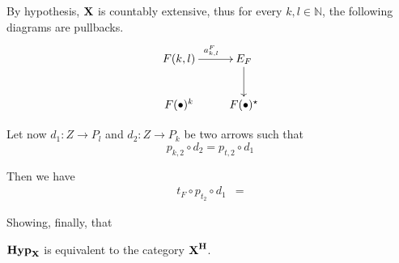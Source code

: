 \documentclass[runningheads,envcountsect]{llncs}
\def\X{\textbf {\textup{X}}}
\newcommand{\catname}[1]{\textbf{\textup{#1}}}
\newcommand{\hyp}{\catname{Hyp}}
\begin{document}
\begin{remark}
 By hypothesis, $\X$ is countably extensive, thus for every $k, l\in \mathbb{N}$, the following diagrams are pullbacks.
 \[\xymatrix{F(k,l) \ar[r]^{a^F_{k,l}} & E_F \ar[d]^{}\\ 
 F(\bullet)^k& F(\bullet)^\star}\]
 
 
 Let now $d_1\colon Z\to P_l$ and $d_2\colon Z\to P_k $ be two arrows such that
 \[p_{k,2}\circ d_2=p_{t,2}\circ d_1\]
 
 Then we have
 \begin{align*}
 t_{F}\circ 	p_{t_2}\circ d_1&= \end{align*}
 
 
 Showing, finally, that 
\end{remark}

\begin{proposition}
	$\hyp_\X$ is equivalent to the category $\catname{\X}^{\catname{H}}$.
\end{proposition}
\end{document}
